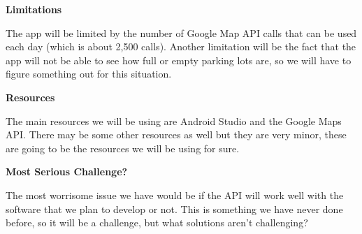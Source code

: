 \documentclass[12pt]{article}
\begin{document}
	
	\begin{flushleft}
		\textbf{Limitations}
	\end{flushleft}
	
	The app will be limited by the number of Google Map API calls that can be used each day (which is about 2,500 calls).  Another limitation will be the fact that the app will not be able to see how full or empty parking lots are, so we will have to figure something out for this situation. \\
	
	
	\begin{flushleft}
		\textbf{Resources}
	\end{flushleft}

	The main resources we will be using are Android Studio and the Google Maps API.  There may be some other resources as well but they are very minor, these are going to be the resources we will be using for sure. \\
	
	
	\begin{flushleft}
		\textbf{Most Serious Challenge?}
	\end{flushleft}

	The most worrisome issue we have would be if the API will work well with the software that we plan to develop or not.  This is something we have never done before, so it will be a challenge, but what solutions aren't challenging?
	
\end{document}
